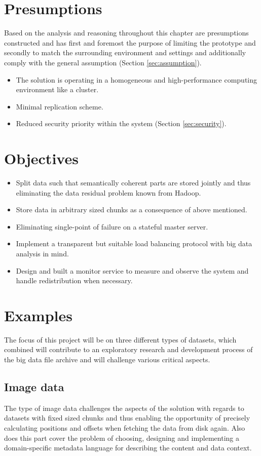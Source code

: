 \section{Presumptions} \label{sec:presumptions}
Based on the analysis and reasoning throughout this chapter are presumptions constructed and has first and foremost the purpose of limiting the prototype and secondly to match the surrounding environment and settings and additionally comply with the general assumption (Section \ref{sec:assumption}).

\begin{itemize}
	\item The solution is operating in a homogeneous and high-performance computing environment like a cluster.
	\item Minimal replication scheme.
	\item Reduced security priority within the system (Section \ref{sec:security}).
\end{itemize}

\section{Objectives} \label{sec:objectives}
\begin{itemize}
	\item Split data such that semantically coherent parts are stored jointly and thus eliminating the data residual problem known from Hadoop.
	\item Store data in arbitrary sized chunks as a consequence of above mentioned.
	\item Eliminating single-point of failure on a stateful master server.
	\item Implement a transparent but suitable load balancing protocol with big data analysis in mind.
	\item Design and built a monitor service to measure and observe the system and handle redistribution when necessary.
\end{itemize}

\section{Examples} \label{sec:examples}
The focus of this project will be on three different types of datasets, which combined will contribute to an exploratory research and development process of the big data file archive and will challenge various critical aspects. 

\subsection*{Image data}
The type of image data challenges the aspects of the solution with regards to datasets with fixed sized chunks and thus enabling the opportunity of precisely calculating positions and offsets when fetching the data from disk again. Also does this part cover the problem of choosing, designing and implementing a domain-specific metadata language for describing the content and data context. 


